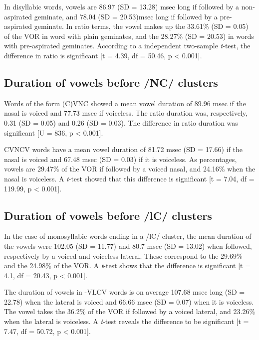 \documentclass[11pt,a4paper,openany]{memoir}\usepackage[]{graphicx}\usepackage[]{color}
\begin{document}
In disyllabic words, vowels are 86.97 (SD = 13.28) msec long if followed by a non-aspirated geminate, and 78.04 (SD = 20.53)msec long if followed by a pre-aspirated geminate.
In ratio terms, the vowel makes up the 33.61\% (SD = 0.05) of the VOR in word with plain geminates, and the 28.27\% (SD = 20.53) in words with pre-aspirated geminates.
According to a independent two-sample \textit{t}-test, the difference in ratio is significant [t = 4.39, df = 50.46, p < 0.001].

\subsection{Duration of vowels before /NC/ clusters}


Words of the form (C)VNC showed a mean vowel duration of 89.96 msec if the nasal is voiced and 77.73 msec if voiceless.
The ratio duration was, respectively, 0.31 (SD = 0.05) and 0.26 (SD = 0.03).
The difference in ratio duration was significant [U = 836, p < 0.001].



CVNCV words have a mean vowel duration of 81.72 msec (SD = 17.66) if the nasal is voiced and 67.48 msec  (SD = 0.03) if it is voiceless.
As percentages, vowels are 29.47\% of the VOR if followed by a voiced nasal, and 24.16\% when the nasal is voiceless.
A \textit{t}-test showed that this difference is significant [t = 7.04, df = 119.99, p < 0.001].


\subsection{Duration of vowels before /lC/ clusters}


In the case of monosyllabic words ending in a /lC/ cluster, the mean duration of the vowels were 102.05 (SD = 11.77) and 80.7 msec (SD = 13.02) when followed, respectively by a voiced and voiceless lateral.
These correspond to the 29.69\% and the 24.98\% of the VOR.
A \textit{t}-test shows that the difference is significant [t = 4.1, df = 20.43, p < 0.001].




The duration of vowels in -VLCV words is on average 107.68 msec long (SD = 22.78) when the lateral is voiced and 66.66 msec (SD = 0.07) when it is voiceless.
The vowel takes the 36.2\% of the VOR if followed by a voiced lateral, and 23.26\% when the lateral is voiceless.
A \textit{t}-test reveals the difference to be significant [t = 7.47, df = 50.72, p < 0.001].
\end{document}

